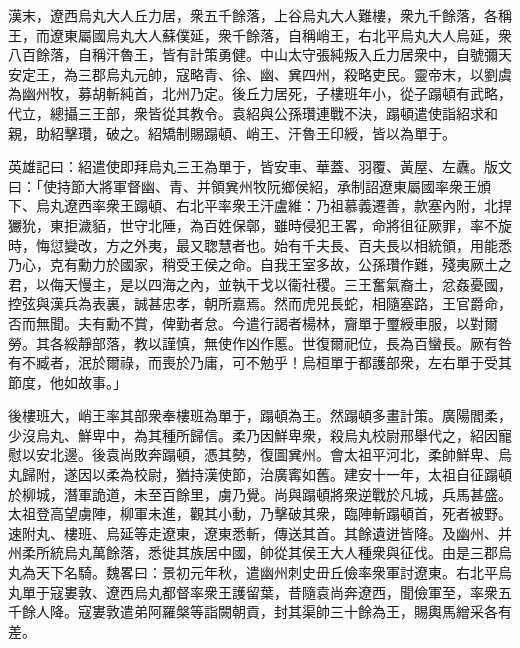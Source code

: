 
\begin{pinyinscope}
漢末，遼西烏丸大人丘力居，衆五千餘落，上谷烏丸大人難樓，衆九千餘落，各稱王，而遼東屬國烏丸大人蘇僕延，衆千餘落，自稱峭王，右北平烏丸大人烏延，衆八百餘落，自稱汗魯王，皆有計策勇健。中山太守張純叛入丘力居衆中，自號彌天安定王，為三郡烏丸元帥，寇略青、徐、幽、兾四州，殺略吏民。靈帝末，以劉虞為幽州牧，募胡斬純首，北州乃定。後丘力居死，子樓班年小，從子蹋頓有武略，代立，總攝三王部，衆皆從其教令。袁紹與公孫瓚連戰不決，蹋頓遣使詣紹求和親，助紹擊瓚，破之。紹矯制賜蹋頓、峭王、汗魯王印綬，皆以為單于。

英雄記曰：紹遣使即拜烏丸三王為單于，皆安車、華蓋、羽覆、黃屋、左纛。版文曰：「使持節大將軍督幽、青、并領兾州牧阮鄉侯紹，承制詔遼東屬國率衆王頒下、烏丸遼西率衆王蹋頓、右北平率衆王汗盧維：乃祖慕義遷善，款塞內附，北捍玁狁，東拒濊貊，世守北陲，為百姓保鄣，雖時侵犯王畧，命將徂征厥罪，率不旋時，悔愆變改，方之外夷，最又聦慧者也。始有千夫長、百夫長以相統領，用能悉乃心，克有勳力於國家，稍受王侯之命。自我王室多故，公孫瓚作難，殘夷厥土之君，以侮天慢主，是以四海之內，並執干戈以衞社稷。三王奮氣裔土，忿姦憂國，控弦與漢兵為表裏，誠甚忠孝，朝所嘉焉。然而虎兕長蛇，相隨塞路，王官爵命，否而無聞。夫有勳不賞，俾勤者怠。今遣行謁者楊林，齎單于璽綬車服，以對爾勞。其各綏靜部落，教以謹慎，無使作凶作慝。世復爾祀位，長為百蠻長。厥有咎有不臧者，泯於爾祿，而喪於乃庸，可不勉乎！烏桓單于都護部衆，左右單于受其節度，他如故事。」

後樓班大，峭王率其部衆奉樓班為單于，蹋頓為王。然蹋頓多畫計策。廣陽閻柔，少沒烏丸、鮮卑中，為其種所歸信。柔乃因鮮卑衆，殺烏丸校尉邢舉代之，紹因寵慰以安北邊。後袁尚敗奔蹋頓，憑其勢，復圖兾州。會太祖平河北，柔帥鮮卑、烏丸歸附，遂因以柔為校尉，猶持漢使節，治廣寗如舊。建安十一年，太祖自征蹋頓於柳城，潛軍詭道，未至百餘里，虜乃覺。尚與蹋頓將衆逆戰於凡城，兵馬甚盛。太祖登高望虜陣，柳軍未進，觀其小動，乃擊破其衆，臨陣斬蹋頓首，死者被野。速附丸、樓班、烏延等走遼東，遼東悉斬，傳送其首。其餘遺迸皆降。及幽州、并州柔所統烏丸萬餘落，悉徙其族居中國，帥從其侯王大人種衆與征伐。由是三郡烏丸為天下名騎。魏畧曰：景初元年秋，遣幽州刺史毌丘儉率衆軍討遼東。右北平烏丸單于寇婁敦、遼西烏丸都督率衆王護留葉，昔隨袁尚奔遼西，聞儉軍至，率衆五千餘人降。寇婁敦遣弟阿羅槃等詣闕朝貢，封其渠帥三十餘為王，賜輿馬繒采各有差。


\end{pinyinscope}